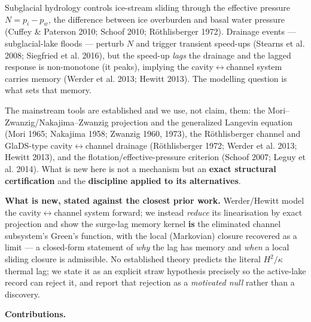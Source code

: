 \documentclass[tc, manuscript]{copernicus}
\begin{document}
\introduction

Subglacial hydrology controls ice-stream sliding through the effective pressure $N=p_{i}-p_{w}$, the difference between ice overburden and basal water pressure (Cuffey \& Paterson 2010; Schoof 2010; Röthlisberger 1972). Drainage events — subglacial-lake floods — perturb $N$ and trigger transient speed-ups (Stearns et al. 2008; Siegfried et al. 2016), but the speed-up \emph{lags} the drainage and the lagged response is non-monotone (it peaks), implying the cavity\ensuremath{\leftrightarrow}channel system carries memory (Werder et al. 2013; Hewitt 2013). The modelling question is what sets that memory.

The mainstream tools are established and we use, not claim, them: the Mori–Zwanzig/Nakajima–Zwanzig projection and the generalized Langevin equation (Mori 1965; Nakajima 1958; Zwanzig 1960, 1973), the Röthlisberger channel and GlaDS-type cavity\ensuremath{\leftrightarrow}channel drainage (Röthlisberger 1972; Werder et al. 2013; Hewitt 2013), and the flotation/effective-pressure criterion (Schoof 2007; Leguy et al. 2014). What is new here is not a mechanism but an \textbf{exact structural certification} and the \textbf{discipline applied to its alternatives}.

\textbf{What is new, stated against the closest prior work.} Werder/Hewitt model the cavity\ensuremath{\leftrightarrow}channel system forward; we instead \emph{reduce} its linearisation by exact projection and show the surge-lag memory kernel \textbf{is} the eliminated channel subsystem's Green's function, with the local (Markovian) closure recovered as a limit — a closed-form statement of \emph{why} the lag has memory and \emph{when} a local sliding closure is admissible. No established theory predicts the literal $H^{2}/\kappa $ thermal lag; we state it as an explicit straw hypothesis precisely so the active-lake record can reject it, and report that rejection as a \emph{motivated null} rather than a discovery.

\textbf{Contributions.}
\end{document}
